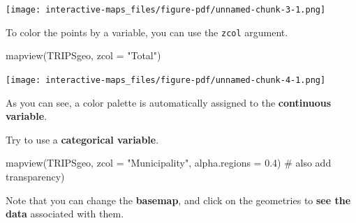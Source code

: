 \documentclass[
  letterpaper,
  DIV=11,
  numbers=noendperiod]{scrreprt}
\newenvironment{Shaded}{\begin{snugshade}}{\end{snugshade}}
\newcommand{\AttributeTok}[1]{\textcolor[rgb]{0.40,0.45,0.13}{#1}}
\newcommand{\CommentTok}[1]{\textcolor[rgb]{0.37,0.37,0.37}{#1}}
\newcommand{\FloatTok}[1]{\textcolor[rgb]{0.68,0.00,0.00}{#1}}
\newcommand{\FunctionTok}[1]{\textcolor[rgb]{0.28,0.35,0.67}{#1}}
\newcommand{\NormalTok}[1]{\textcolor[rgb]{0.00,0.23,0.31}{#1}}
\newcommand{\StringTok}[1]{\textcolor[rgb]{0.13,0.47,0.30}{#1}}
\begin{document}
\texttt{[image: interactive-maps\_files/figure-pdf/unnamed-chunk-3-1.png]}

To color the points by a variable, you can use the \texttt{zcol}
argument.

\begin{Shaded}
\begin{Highlighting}[]
\FunctionTok{mapview}\NormalTok{(TRIPSgeo, }\AttributeTok{zcol =} \StringTok{"Total"}\NormalTok{)}
\end{Highlighting}
\end{Shaded}

\texttt{[image: interactive-maps\_files/figure-pdf/unnamed-chunk-4-1.png]}

As you can see, a color palette is automatically assigned to the
\textbf{continuous variable}.

Try to use a \textbf{categorical variable}.

\begin{Shaded}
\begin{Highlighting}[]
\FunctionTok{mapview}\NormalTok{(TRIPSgeo, }\AttributeTok{zcol =} \StringTok{"Municipality"}\NormalTok{, }\AttributeTok{alpha.regions =} \FloatTok{0.4}\NormalTok{) }\CommentTok{\# also add transparency)}
\end{Highlighting}
\end{Shaded}

\begin{tcolorbox}[enhanced jigsaw, breakable, left=2mm, colframe=quarto-callout-note-color-frame, leftrule=.75mm, bottomrule=.15mm, arc=.35mm, rightrule=.15mm, colback=white, opacityback=0, toprule=.15mm]
\begin{minipage}[t]{5.5mm}
\textcolor{quarto-callout-note-color}{\faInfo}
\end{minipage}%
\begin{minipage}[t]{\textwidth - 5.5mm}

Note that you can change the \textbf{basemap}, and click on the
geometries to \textbf{see the data} associated with them.

\end{minipage}%
\end{tcolorbox}
\end{document}
